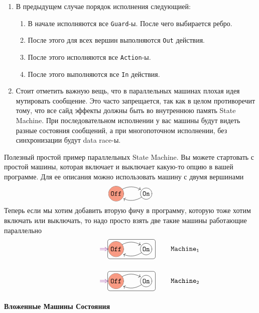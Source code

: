 \documentclass{article}
\begin{document}
{\begin{enumerate}
\item В предыдущем случае порядок исполнения следующией:
\begin{enumerate}
\item В начале исполняются все \verb"Guard"-ы.
После чего выбирается ребро.

\item После этого для всех вершин выполняются \verb"Out" действия.

\item После этого исполняются все \verb"Action"-ы.

\item После этого выполняются все \verb"In" действия.
\end{enumerate}


\item Стоит отметить важную вещь, что в параллельных машинах плохая идея мутировать сообщение.
Это часто запрещается, так как в целом противоречит тому, что все сайд эффекты должны быть во внутреннюю память State Machine.
При последовательном исполнении у вас машины будут видеть разные состояния сообщений, а при многопоточном исполнении, без синхронизации будут data race-ы.
\end{enumerate}

Полезный простой пример параллельных State Machine.
Вы можете стартовать с простой машины, которая включает и выключает какую-то опцию в вашей программе.
Для ее описания можно использовать машину с двумя вершинами
\[
\xymatrix{
    *+=+[o][F*:InitialStateColor][F-]{\texttt{Off}}\ar@/^10pt/[r]&
  *+=+[o][F-]{\texttt{On}}\ar@/^10pt/[l]\\
}
\]
Теперь если мы хотим добавить вторую фичу в программу, которую тоже хотим включать или выключать, то надо просто взять две такие машины работающие параллельно
\[
\xymatrix{
    {}\ar@{}[r]|(.40){}="A"|(.7){}="B"\ar@[Plum]@{=>} "A";"B"&
    *+=+[o][F*:InitialStateColor][F-]{\texttt{Off}}
    \ar@/^10pt/[r]&
    *+=+[o][F-]{\texttt{On}}
    {\save [l].[]*+[F-:<3pt>]\frm{}\restore}
    \ar@/^10pt/[l]&
    {\mathmakebox[0pt][l]{\texttt{Machine}_\texttt{1}}}\\
   {}\ar@{}[r]|(.40){}="C"|(.7){}="D"\ar@[Plum]@{=>} "C";"D"&
     *+=+[o][F*:InitialStateColor][F-]{\texttt{Off}}
    \ar@/^10pt/[r]&
    *+=+[o][F-]{\texttt{On}}
    {\save [l].[]*+[F-:<3pt>]\frm{}\restore}
    \ar@/^10pt/[l]&
    {\mathmakebox[0pt][l]{\texttt{Machine}_\texttt{2}}}\\
}
\]

\paragraph{Вложенные Машины Состояния}

}
\end{document}
